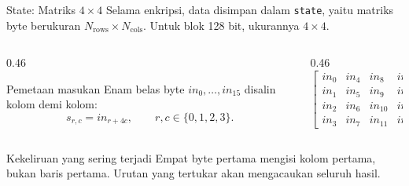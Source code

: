 \documentclass[aspectratio=169,11pt]{beamer}
\begin{document}
\begin{frame}{State: Matriks $4 \times 4$}
    \footnotesize
    Selama enkripsi, data disimpan dalam \texttt{state}, yaitu matriks
    byte berukuran $N_{\text{rows}} \times N_{\text{cols}}$. Untuk blok
    128 bit, ukurannya $4 \times 4$.
    \vspace{0.1cm}
    \begin{columns}[T,onlytextwidth]
        \begin{column}{0.46\textwidth}
            \begin{block}{Pemetaan masukan}
                Enam belas byte $in_0, \dots, in_{15}$ disalin kolom demi
                kolom:
                \[
                    s_{r,c} = in_{r + 4c}, \qquad r,c \in \{0,1,2,3\}.
                \]
            \end{block}
        \end{column}
        \begin{column}{0.46\textwidth}
            \centering
            \[
            \begin{bmatrix}
                in_0 & in_4 & in_8  & in_{12} \\
                in_1 & in_5 & in_9  & in_{13} \\
                in_2 & in_6 & in_{10} & in_{14} \\
                in_3 & in_7 & in_{11} & in_{15}
            \end{bmatrix}
            \]
        \end{column}
    \end{columns}
    \vspace{0.1cm}
    \begin{alertblock}{Kekeliruan yang sering terjadi}
        \footnotesize
        Empat byte pertama mengisi kolom pertama, bukan baris pertama.
        Urutan yang tertukar akan mengacaukan seluruh hasil.
    \end{alertblock}
\end{frame}
\end{document}
